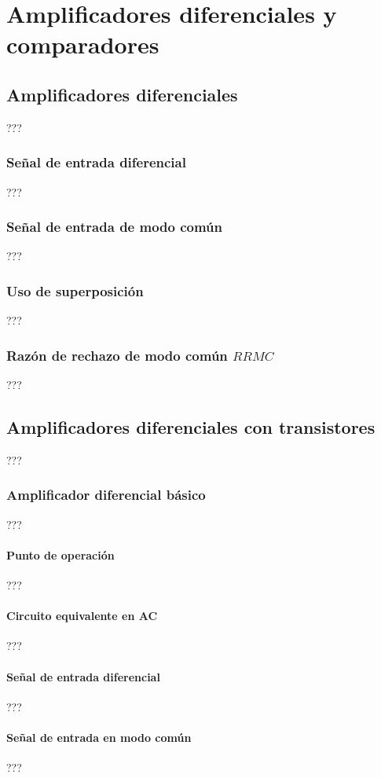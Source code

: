 
\chapter{Amplificadores diferenciales y comparadores}
\section{Amplificadores diferenciales}
???
\subsection{Señal de entrada diferencial}
???
\subsection{Señal de entrada de modo común}
???
\subsection{Uso de superposición}
???
\subsection{Razón de rechazo de modo común $RRMC$}
???
\section{Amplificadores diferenciales con transistores}
???
\subsection{Amplificador diferencial básico}
???
\subsubsection{Punto de operación}
???
\subsubsection{Circuito equivalente en AC}
???
\subsubsection{Señal de entrada diferencial}
???
\subsubsection{Señal de entrada en modo común}
???
